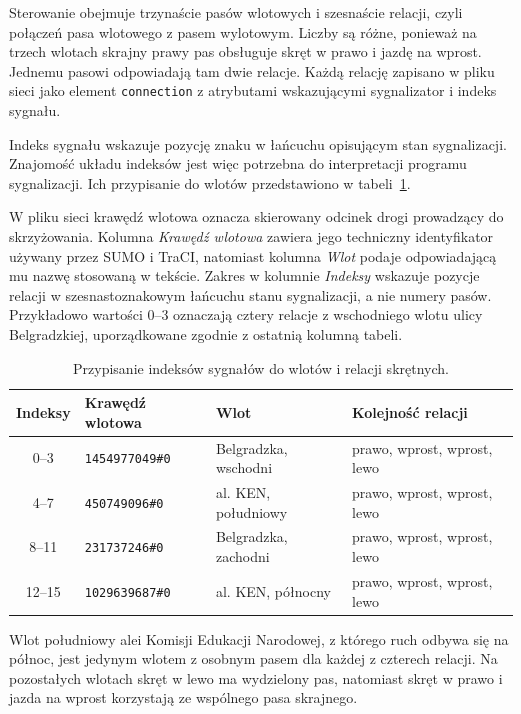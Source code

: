 Sterowanie obejmuje trzynaście pasów wlotowych i szesnaście relacji, czyli połączeń pasa wlotowego z pasem wylotowym. Liczby są różne, ponieważ na trzech wlotach skrajny prawy pas obsługuje skręt w prawo i jazdę na wprost. Jednemu pasowi odpowiadają tam dwie relacje. Każdą relację zapisano w pliku sieci jako element \texttt{connection} z atrybutami wskazującymi sygnalizator i indeks sygnału.

Indeks sygnału wskazuje pozycję znaku w łańcuchu opisującym stan sygnalizacji. Znajomość układu indeksów jest więc potrzebna do interpretacji programu sygnalizacji. Ich przypisanie do wlotów przedstawiono w tabeli~\ref{tab:indeksy-sygnalow}.

W pliku sieci krawędź wlotowa oznacza skierowany odcinek drogi prowadzący do skrzyżowania. Kolumna \emph{Krawędź wlotowa} zawiera jego techniczny identyfikator używany przez SUMO i TraCI, natomiast kolumna \emph{Wlot} podaje odpowiadającą mu nazwę stosowaną w tekście. Zakres w kolumnie \emph{Indeksy} wskazuje pozycje relacji w szesnastoznakowym łańcuchu stanu sygnalizacji, a nie numery pasów. Przykładowo wartości 0--3 oznaczają cztery relacje z wschodniego wlotu ulicy Belgradzkiej, uporządkowane zgodnie z ostatnią kolumną tabeli.

\begin{table}[htbp] \centering
    \caption{Przypisanie indeksów sygnałów do wlotów i relacji skrętnych.}
    \label{tab:indeksy-sygnalow}
    \small
    \begin{tabular}{| c | l | l | l |} \hline
        Indeksy & Krawędź wlotowa & Wlot & Kolejność relacji \\ \hline\hline
        0--3   & \texttt{1454977049\#0} & Belgradzka, wschodni & prawo, wprost, wprost, lewo \\ \hline
        4--7   & \texttt{450749096\#0}  & al. KEN, południowy  & prawo, wprost, wprost, lewo \\ \hline
        8--11  & \texttt{231737246\#0}  & Belgradzka, zachodni & prawo, wprost, wprost, lewo \\ \hline
        12--15 & \texttt{1029639687\#0} & al. KEN, północny    & prawo, wprost, wprost, lewo \\ \hline
    \end{tabular}
\end{table}
\FloatBarrier

Wlot południowy alei Komisji Edukacji Narodowej, z którego ruch odbywa się na północ, jest jedynym wlotem z osobnym pasem dla każdej z czterech relacji. Na pozostałych wlotach skręt w lewo ma wydzielony pas, natomiast skręt w prawo i jazda na wprost korzystają ze wspólnego pasa skrajnego.

